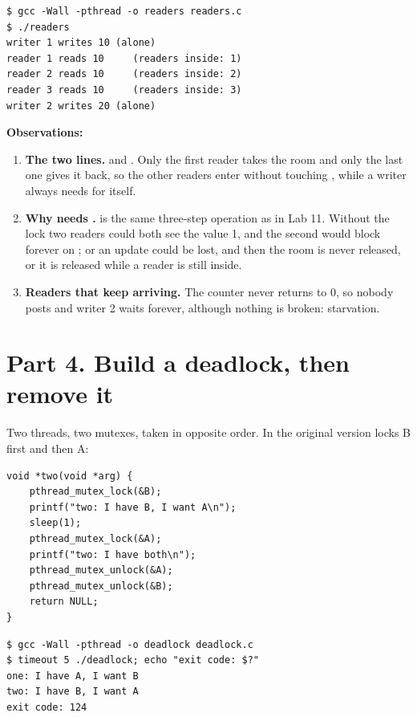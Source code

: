\documentclass[11pt,a4paper]{article}
\begin{document}
\begin{lstlisting}[caption={readers}]
$ gcc -Wall -pthread -o readers readers.c
$ ./readers
writer 1 writes 10 (alone)
reader 1 reads 10     (readers inside: 1)
reader 2 reads 10     (readers inside: 2)
reader 3 reads 10     (readers inside: 3)
writer 2 writes 20 (alone)
\end{lstlisting}

\textbf{Observations:}
\begin{enumerate}
  \item \textbf{The two lines.}  and
  . Only the first reader takes the room and only
  the last one gives it back, so the other readers enter without touching , while a
  writer always needs  for itself.
  \item \textbf{Why  needs .}  is the same three-step
  operation as  in Lab 11. Without the lock two readers could both see the
  value 1, and the second would block forever on ; or an update could be lost, and
  then the room is never released, or it is released while a reader is still inside.
  \item \textbf{Readers that keep arriving.} The counter never returns to 0, so nobody posts
   and writer 2 waits forever, although nothing is broken: starvation.
\end{enumerate}

\section{Part 4. Build a deadlock, then remove it}

Two threads, two mutexes, taken in opposite order. In the original version  locks B
first and then A:

\begin{lstlisting}[style=ccode,caption={two() in the original deadlock.c}]
void *two(void *arg) {
    pthread_mutex_lock(&B);
    printf("two: I have B, I want A\n");
    sleep(1);
    pthread_mutex_lock(&A);
    printf("two: I have both\n");
    pthread_mutex_unlock(&A);
    pthread_mutex_unlock(&B);
    return NULL;
}
\end{lstlisting}

\begin{lstlisting}[caption={The deadlock}]
$ gcc -Wall -pthread -o deadlock deadlock.c
$ timeout 5 ./deadlock; echo "exit code: $?"
one: I have A, I want B
two: I have B, I want A
exit code: 124
\end{lstlisting}
\end{document}
